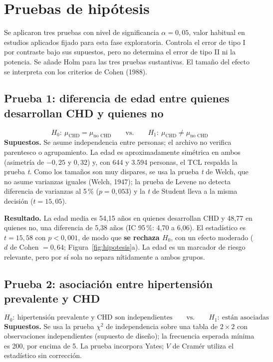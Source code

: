 \documentclass[11pt,a4paper]{article}
\begin{document}
\section{Pruebas de hipótesis}

Se aplicaron tres pruebas con nivel de significancia $\alpha=0{,}05$, valor habitual en estudios aplicados
fijado para esta fase exploratoria. Controla el error de tipo I por contraste bajo sus supuestos,
pero no determina el error de tipo II ni la potencia. Se añade Holm para las tres pruebas sustantivas. El tamaño del
efecto se interpreta con los criterios de Cohen (1988).

\subsection{Prueba 1: diferencia de edad entre quienes desarrollan CHD y quienes no}
$$H_0:\ \mu_{\text{CHD}} = \mu_{\text{no CHD}} \qquad \text{vs.} \qquad H_1:\ \mu_{\text{CHD}} \neq \mu_{\text{no CHD}}$$
\textbf{Supuestos.} Se asume independencia entre personas; el archivo no verifica parentesco o agrupamiento. La edad es aproximadamente simétrica en ambos (asimetría
de $-0{,}25$ y $0{,}32$) y, con 644 y 3.594 personas, el TCL respalda la prueba \textit{t}. Como los tamaños son
muy dispares, se usa la prueba \textit{t} de Welch, que no asume varianzas iguales (Welch, 1947); la prueba de
Levene no detecta diferencia de varianzas al 5\,\% ($p=0{,}053$) y la \textit{t} de Student lleva a la misma
decisión ($t=15{,}05$).

\textbf{Resultado.} La edad media es 54{,}15 años en quienes desarrollan CHD y 48{,}77 en quienes no, una
diferencia de 5{,}38 años (IC 95\,\%: 4{,}70 a 6{,}06). El estadístico es $t=15{,}58$ con $p<0{,}001$, de modo
que \textbf{se rechaza $H_0$}, con un efecto moderado ($d$ de Cohen $=0{,}64$; Figura~\ref{fig:hipotesis}a).
La edad es un marcador de riesgo relevante, pero por sí sola no separa nítidamente a ambos grupos.

\subsection{Prueba 2: asociación entre hipertensión prevalente y CHD}
$$H_0:\ \text{hipertensión prevalente y CHD son independientes} \qquad \text{vs.} \qquad H_1:\ \text{están asociadas}$$
\textbf{Supuestos.} Se usa la prueba $\chi^2$ de independencia sobre una tabla de $2\times2$ con observaciones
independientes (supuesto de diseño); la frecuencia esperada mínima es 200, por encima de 5.
La prueba incorpora Yates; $V$ de Cramér utiliza el estadístico sin corrección.
\end{document}
